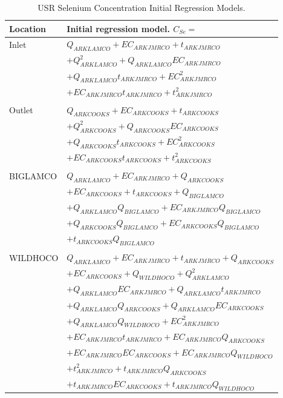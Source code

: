 \begin{linenumbers}
\begin{table}[htbp]
\centering
\caption{USR Selenium Concentration Initial Regression Models.}
\label{tab:DSRInitialRegression}
\begin{tabular}{ll}
	\toprule
	Location		& Initial regression model. $C_{Se}=$\\
	\midrule
	\midrule
	Inlet		& $Q_{ARKLAMCO} + EC_{ARKJMRCO} + t_{ARKJMRCO}$\\
					& $+Q_{ARKLAMCO}^2 + Q_{ARKLAMCO}EC_{ARKJMRCO}$\\
					& $+ Q_{ARKLAMCO}t_{ARKJMRCO} + EC_{ARKJMRCO}^2$\\
					& $+ EC_{ARKJMRCO}t_{ARKJMRCO} + t_{ARKJMRCO}^2$\\
	\\
	Outlet		& $Q_{ARKCOOKS} + EC_{ARKCOOKS} + t_{ARKCOOKS}$\\
					& $+Q_{ARKCOOKS}^2 + Q_{ARKCOOKS}EC_{ARKCOOKS}$\\
					& $+ Q_{ARKCOOKS}t_{ARKCOOKS} + EC_{ARKCOOKS}^2$\\
					& $+ EC_{ARKCOOKS}t_{ARKCOOKS} + t_{ARKCOOKS}^2$\\
	\\
	BIGLAMCO		& $Q_{ARKLAMCO} + EC_{ARKJMRCO} + Q_{ARKCOOKS}$\\ 
					& $+ EC_{ARKCOOKS} + t_{ARKCOOKS} + Q_{BIGLAMCO}$\\
					& $+ Q_{ARKLAMCO}Q_{BIGLAMCO} + EC_{ARKJMRCO}Q_{BIGLAMCO}$\\
					& $+ Q_{ARKCOOKS}Q_{BIGLAMCO} + EC_{ARKCOOKS}Q_{BIGLAMCO}$\\
					& $+ t_{ARKCOOKS}Q_{BIGLAMCO}$\\
	\\
	WILDHOCO		& $Q_{ARKLAMCO} + EC_{ARKJMRCO} + t_{ARKJMRCO} + Q_{ARKCOOKS}$\\
					& $+ EC_{ARKCOOKS} + Q_{WILDHOCO} + Q_{ARKLAMCO}^2 $\\
					& $+ Q_{ARKLAMCO} EC_{ARKJMRCO}+ Q_{ARKLAMCO} t_{ARKJMRCO} $\\
					& $+ Q_{ARKLAMCO} Q_{ARKCOOKS}+ Q_{ARKLAMCO} EC_{ARKCOOKS} $\\
					& $+ Q_{ARKLAMCO} Q_{WILDHOCO}+ EC_{ARKJMRCO}^2 $\\
					& $+ EC_{ARKJMRCO} t_{ARKJMRCO}+ EC_{ARKJMRCO} Q_{ARKCOOKS} $\\
					& $+ EC_{ARKJMRCO} EC_{ARKCOOKS}+ EC_{ARKJMRCO} Q_{WILDHOCO} $\\
					& $+ t_{ARKJMRCO}^2+ t_{ARKJMRCO} Q_{ARKCOOKS} $\\
					& $+ t_{ARKJMRCO} EC_{ARKCOOKS}+ t_{ARKJMRCO} Q_{WILDHOCO} $\\

\end{tabular}
\end{table}
\end{linenumbers}
